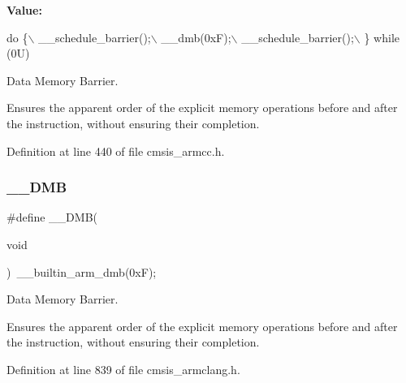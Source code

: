 {\bfseries Value\+:}
\begin{DoxyCode}
\textcolor{keywordflow}{do} \{\(\backslash\)
                   \_\_schedule\_barrier();\(\backslash\)
                   \_\_dmb(0xF);\(\backslash\)
                   \_\_schedule\_barrier();\(\backslash\)
                \} \textcolor{keywordflow}{while} (0U)
\end{DoxyCode}


Data Memory Barrier. 

Ensures the apparent order of the explicit memory operations before and after the instruction, without ensuring their completion. 

Definition at line 440 of file cmsis\+\_\+armcc.\+h.

\mbox{\label{group___c_m_s_i_s___core___instruction_interface_ga671101179b5943990785f36f8c1e2269}} 
\subsubsection{\texorpdfstring{\+\_\+\+\_\+\+D\+MB}{\_\_DMB}\hspace{0.1cm}{\footnotesize\ttfamily [2/2]}}
{\footnotesize\ttfamily \#define \+\_\+\+\_\+\+D\+MB(\begin{DoxyParamCaption}\item[{}]{void }\end{DoxyParamCaption})~\+\_\+\+\_\+builtin\+\_\+arm\+\_\+dmb(0x\+F);}



Data Memory Barrier. 

Ensures the apparent order of the explicit memory operations before and after the instruction, without ensuring their completion. 

Definition at line 839 of file cmsis\+\_\+armclang.\+h.

\mbox{\label{group___c_m_s_i_s___core___instruction_interface_ga067d257a2b34565410acefb5afef2203}} 
